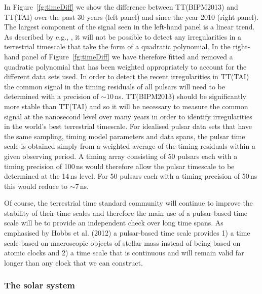 \documentclass{raa}            %
\begin{document}
In Figure~\ref{fg:timeDiff} we show the difference between TT(BIPM2013) and TT(TAI) over the past 30 years (left panel) and since the year 2010 (right panel).  The largest component of the signal seen in the left-hand panel is a linear trend. As described by e.g., \cite{hcm+12}, it will not be possible to detect any irregularities in a terrestrial timescale that take the form of a quadratic polynomial.  In the right-hand panel of Figure~\ref{fg:timeDiff} we have therefore fitted and removed a quadratic polynomial  that has been weighted appropriately to account for the different data sets used.  In order to detect the recent irregularities in TT(TAI) the common signal in the timing residuals of all pulsars will need to be determined with a precision of $\sim 10$\,ns.  TT(BIPM2013) should be significantly more stable than TT(TAI) and so it will be necessary to measure the common signal at the nanosecond level over many years in order to identify irregularities in the world's best terrestrial timescale.  For idealised pulsar data sets that have the same sampling, timing model parameters and data spans, the pulsar time scale is obtained simply from a weighted average of the timing residuals within a given observing period.  A timing array consisting of 50 pulsars each with a timing precision of 100\,ns would therefore allow the pulsar timescale to be determined at the 14\,ns level. For 50 pulsars each with a timing precision of 50\,ns this would reduce to $\sim$7\,ns.  

Of course,  the terrestrial time standard community will continue to improve the stability of their time scales and therefore the main use of a pulsar-based time scale will be to provide an independent check over long time spans. As emphasised by Hobbs et al. (2012) a pulsar-based time scale provides 1) a time scale based on macroscopic objects of stellar mass instead of being based on atomic clocks and 2) a time scale that is continuous and will remain valid far longer than any clock that we can construct. 


\subsubsection{The solar system}
\end{document}
